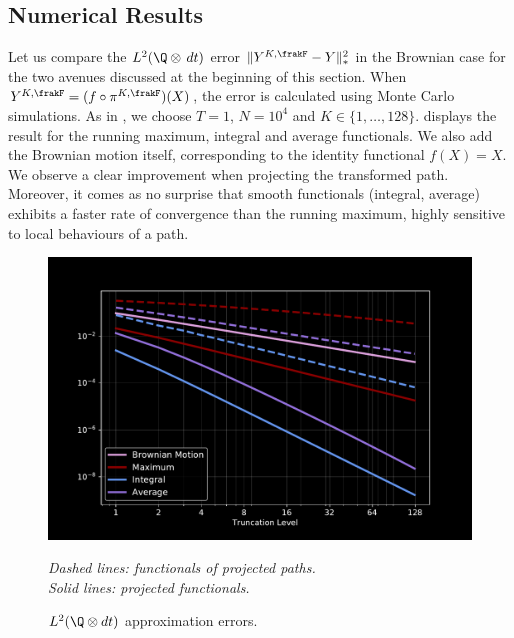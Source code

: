 \subsection{Numerical Results} \label{ssec: numResult}
Let us compare the $L^2(\Q \otimes \, dt)$ error  
$\lVert Y^{K,\frakF} - Y \rVert^2_{*} $ in the Brownian case for the two avenues discussed at the beginning of this section. When $Y^{K,\frakF} = (f \circ \pi^{K,\frakF})(X) $, the error is calculated using Monte Carlo simulations. As in  , we choose $T=1$, $N=10^4$ and $K\in \{1,\ldots,128\}$.  
 displays the result for the running maximum, integral and average functionals. We also add the Brownian motion itself, corresponding to the identity functional $f(X)=X$. We observe a clear improvement when projecting the transformed path. Moreover, it comes as no surprise that smooth functionals (integral, average) exhibits a faster rate of convergence than the running maximum, highly sensitive to local behaviours of a path. 

\begin{figure}%
    \centering
    \caption{$L^2(\Q \otimes dt)$ approximation errors. }
    \vspace{-2mm}
    \includegraphics[scale =0.38]{KL/Figures/Error_nSim5000_N1000.pdf}
    \label{fig:L2Error}
    \\
    
    \vspace{1mm}
    
    \footnotesize{
    \textit{Dashed lines: functionals of projected paths. \\Solid lines: projected functionals.}}
\end{figure}

